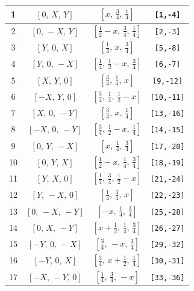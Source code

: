 \documentclass[fleqn,8pt]{jsarticle}
\begin{document}
\begin{longtable}{cccc}
1 & $\left[ 0,\, X,\, Y \right]$ & $\left[ x,\, \frac{3}{4},\, \frac{1}{4} \right]$ & {\tt [1,-4]} \\ \hline
2 & $\left[ 0,\, - X,\, Y \right]$ & $\left[ \frac{1}{2} - x,\, \frac{3}{4},\, \frac{1}{4} \right]$ & {\tt [2,-3]} \\ \hline
3 & $\left[ Y,\, 0,\, X \right]$ & $\left[ \frac{1}{4},\, x,\, \frac{3}{4} \right]$ & {\tt [5,-8]} \\ \hline
4 & $\left[ Y,\, 0,\, - X \right]$ & $\left[ \frac{1}{4},\, \frac{1}{2} - x,\, \frac{3}{4} \right]$ & {\tt [6,-7]} \\ \hline
5 & $\left[ X,\, Y,\, 0 \right]$ & $\left[ \frac{3}{4},\, \frac{1}{4},\, x \right]$ & {\tt [9,-12]} \\ \hline
6 & $\left[ - X,\, Y,\, 0 \right]$ & $\left[ \frac{3}{4},\, \frac{1}{4},\, \frac{1}{2} - x \right]$ & {\tt [10,-11]} \\ \hline
7 & $\left[ X,\, 0,\, - Y \right]$ & $\left[ \frac{3}{4},\, x,\, \frac{1}{4} \right]$ & {\tt [13,-16]} \\ \hline
8 & $\left[ - X,\, 0,\, - Y \right]$ & $\left[ \frac{3}{4},\, \frac{1}{2} - x,\, \frac{1}{4} \right]$ & {\tt [14,-15]} \\ \hline
9 & $\left[ 0,\, Y,\, - X \right]$ & $\left[ x,\, \frac{1}{4},\, \frac{3}{4} \right]$ & {\tt [17,-20]} \\ \hline
10 & $\left[ 0,\, Y,\, X \right]$ & $\left[ \frac{1}{2} - x,\, \frac{1}{4},\, \frac{3}{4} \right]$ & {\tt [18,-19]} \\ \hline
11 & $\left[ Y,\, X,\, 0 \right]$ & $\left[ \frac{1}{4},\, \frac{3}{4},\, \frac{1}{2} - x \right]$ & {\tt [21,-24]} \\ \hline
12 & $\left[ Y,\, - X,\, 0 \right]$ & $\left[ \frac{1}{4},\, \frac{3}{4},\, x \right]$ & {\tt [22,-23]} \\ \hline
13 & $\left[ 0,\, - X,\, - Y \right]$ & $\left[ - x,\, \frac{1}{4},\, \frac{3}{4} \right]$ & {\tt [25,-28]} \\ \hline
14 & $\left[ 0,\, X,\, - Y \right]$ & $\left[ x + \frac{1}{2},\, \frac{1}{4},\, \frac{3}{4} \right]$ & {\tt [26,-27]} \\ \hline
15 & $\left[ - Y,\, 0,\, - X \right]$ & $\left[ \frac{3}{4},\, - x,\, \frac{1}{4} \right]$ & {\tt [29,-32]} \\ \hline
16 & $\left[ - Y,\, 0,\, X \right]$ & $\left[ \frac{3}{4},\, x + \frac{1}{2},\, \frac{1}{4} \right]$ & {\tt [30,-31]} \\ \hline
17 & $\left[ - X,\, - Y,\, 0 \right]$ & $\left[ \frac{1}{4},\, \frac{3}{4},\, - x \right]$ & {\tt [33,-36]} \\ \hline

\end{longtable}
\end{document}
